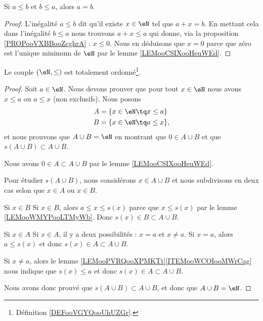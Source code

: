 \begin{lemma}       \label{LEMooJRZKooOMhOkH}
	Si \( a\leq b\) et \( b\leq a\), alors \( a=b\).
\end{lemma}

\begin{proof}
	L'inégalité \( a\leq b\) dit qu'il existe \( x\in \eN\) tel que \( a+x=b\). En mettant cela dans l'inégalité \( b\leq a\) nous trouvons \( a+x\leq a\) qui donne, via la proposition \ref{PROPooVXBBooZcghrA} : \( x\leq 0\). Nous en déduisons que \( x=0\) parce que zéro est l'unique minimum de \( \eN\) par le lemme \ref{LEMooCSIXooHeuWEd}.
\end{proof}

\begin{proposition}     \label{PROPooGCCRooFBYrlo}
	Le couple \( (\eN,\leq)\) est totalement ordonné\footnote{Définition \ref{DEFooVGYQooUhUZGr}.}.
\end{proposition}

\begin{proof}
	Soit \( a\in \eN\). Nous devons prouver que pour tout \( x\in \eN\) nous avons \( x\leq a\) ou \( a\leq x\) (non exclusifs). Nous posons
	\begin{subequations}
		\begin{align}
			A & =\{ x\in \eN\tq x\leq a \}  \\
			B & =\{ x\in \eN\tq a\leq x \},
		\end{align}
	\end{subequations}
	et nous prouvons que \( A\cup B=\eN\) en montrant que \( 0\in A\cup B\) et que \( s(A\cup B)\subset A\cup B\).

	Nous avons \( 0\in A\subset A\cup B\) par le lemme \ref{LEMooCSIXooHeuWEd}.

	Pour étudier \( s(A\cup B)\), nous considérons \( x\in A\cup B\) et nous subdivisons en deux cas selon que \( x\in A\) ou \( x\in B\).

	\begin{subproof}
		\item[Si \( x\in B\)]
		Si \( x\in B\), alors \( a\leq x\leq s(x)\) parce que \( x\leq s(x)\) par le lemme \ref{LEMooWMYPooLTMyWb}. Donc \( s(x)\in B\subset A\cup B\).
		\item[Si \( x\in A\)]
		Si \( x\in A\), il y a deux possibilités : \( x=a\) et \( x\neq a\). Si \( x=a\), alors \( a\leq s(x)\) et donc \( s(x)\in A\subset A\cup B\).

		Si \( x\neq a\), alors le lemme \ref{LEMooPVRQooXPMKTt}\ref{ITEMooWCOIooMWrCag} nous indique que \( s(x)\leq a\) et donc \( s(x)\in A\subset A\cup B\).
	\end{subproof}
	Nous avons donc prouvé que \( s(A\cup B)\subset A\cup B\), et donc que \( A\cup B=\eN\).
\end{proof}

